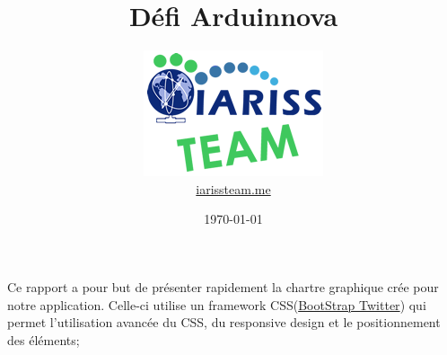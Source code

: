 \documentclass[12pt, a4paper]{article}
\title{Défi Arduinnova}
\begin{document}
\author{\includegraphics{../_img/iariss_team.png} \\ {\sffamily \href{http://iarissteam.me}{iarissteam.me}}}
\date{\today}

\maketitle{}

{\sffamily Ce rapport a pour but de présenter rapidement la chartre graphique crée pour notre application. Celle-ci utilise un framework CSS(\href{http://twitter.github.com/bootstrap/}{BootStrap Twitter}) qui permet l'utilisation avancée du CSS, du responsive design et le positionnement des éléments;} 
\end{document}
